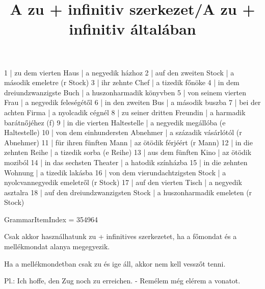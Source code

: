 \begin{exmp}
1 | zu dem vierten Haus | a negyedik házhoz
2 | auf den zweiten Stock | a második emeletre (r Stock)
3 | ihr zehnte Chef | a tizedik főnöke
4 | in dem dreiundzwanzigste Buch | a huszonharmadik könyvben
5 | von seinem vierten Frau | a negyedik feleségétől
6 | in den zweiten Bus | a második buszba
7 | bei der achten Firma | a nyolcadik cégnél
8 | zu seiner dritten Freundin | a harmadik barátnőjéhez (f)
9 | in die vierten Haltestelle | a negyedik megállóba (e Haltestelle)
10 | von dem einhundersten Abnehmer | a századik vásárlótól (r Abnehmer)
11 | für ihren fünften Mann | az ötödik férjéért (r Mann)
12 | in die zehnten Reihe | a tizedik sorba (e Reihe)
13 | aus dem fünften Kino | az ötödik moziból
14 | in das sechsten Theater | a hatodik színházba
15 | in die zehnten Wohnung | a tizedik lakásba
16 | von dem vierundachtzigsten Stock | a nyolcvannegyedik emeletről (r Stock)
17 | auf den vierten Tisch | a negyedik asztalra
18 | auf den dreiundzwanzigsten Stock | a huszonharmadik emeleten (r Stock)
\end{exmp}

\title{A zu + infinitiv szerkezet/A zu + infinitiv általában}

GrammarItemIndex = 354964

\begin{desc}
Csak akkor használhatunk zu + infinitives szerkezetet, ha a főmondat és a mellékmondat alanya megegyezik.

Ha a mellékmondetban csak zu és ige áll, akkor nem kell vesszőt tenni.

Pl.: Ich hoffe, den Zug noch zu erreichen. - Remélem még elérem a vonatot.
\end{desc}

